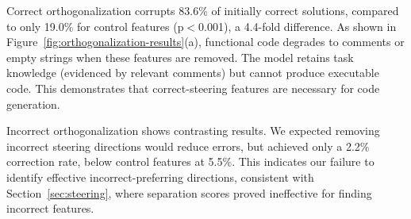 Correct orthogonalization corrupts 83.6\% of initially correct solutions, compared to only 19.0\% for control features (p$<$0.001), a 4.4-fold difference. As shown in Figure~\ref{fig:orthogonalization-results}(a), functional code degrades to comments or empty strings when these features are removed. The model retains task knowledge (evidenced by relevant comments) but cannot produce executable code. This demonstrates that correct-steering features are necessary for code generation.

Incorrect orthogonalization shows contrasting results. We expected removing incorrect steering directions would reduce errors, but achieved only a 2.2\% correction rate, below control features at 5.5\%. This indicates our failure to identify effective incorrect-preferring directions, consistent with Section~\ref{sec:steering}, where separation scores proved ineffective for finding incorrect features.


